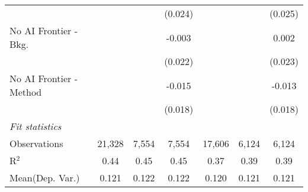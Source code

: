 \begin{tabular}{lcccccc}
                           &              &         & (0.024)      &              &         & (0.025)\\   
   No AI Frontier - Bkg.   &              &         & -0.003       &              &         & 0.002\\   
                           &              &         & (0.022)      &              &         & (0.023)\\   
   No AI Frontier - Method &              &         & -0.015       &              &         & -0.013\\   
                           &              &         & (0.018)      &              &         & (0.018)\\   
   \midrule
   \emph{Fit statistics}\\
   Observations            & 21,328       & 7,554   & 7,554        & 17,606       & 6,124   & 6,124\\  
   R$^2$                   & 0.44         & 0.45    & 0.45         & 0.37         & 0.39    & 0.39\\  
Mean(Dep. Var.) & 0.121 & 0.122 & 0.122 & 0.120 & 0.121 & 0.121 \\
   

\end{tabular}
